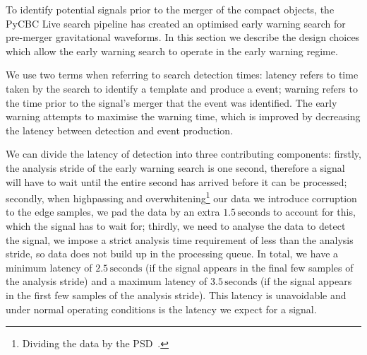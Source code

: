 To identify potential \gwadj signals prior to the merger of the compact objects, the PyCBC Live search pipeline has created an optimised early warning search for pre-merger gravitational waveforms. In this section we describe the design choices which allow the early warning search to operate in the early warning regime.

We use two terms when referring to search detection times: latency refers to time taken by the search to identify a \gwadj template and produce a \gwadj event; warning refers to the time prior to the \gwadj signal's merger that the event was identified. The early warning attempts to maximise the warning time, which is improved by decreasing the latency between detection and event production.

We can divide the latency of detection into three contributing components: firstly, the analysis stride of the early warning search is one second, therefore a signal will have to wait until the entire second has arrived before it can be processed; secondly, when highpassing and overwhitening\footnote{Dividing the data by the PSD~\cite{FINDCHIRP:2012}.} our data we introduce corruption to the edge samples, we pad the data by an extra $1.5 \, \text{seconds}$ to account for this, which the signal has to wait for; thirdly, we need to analyse the data to detect the signal, we impose a strict analysis time requirement of less than the analysis stride, so data does not build up in the processing queue. In total, we have a minimum latency of $2.5 \, \text{seconds}$ (if the signal appears in the final few samples of the analysis stride) and a maximum latency of $3.5 \, \text{seconds}$ (if the signal appears in the first few samples of the analysis stride). This latency is unavoidable and under normal operating conditions is the latency we expect for a signal.

